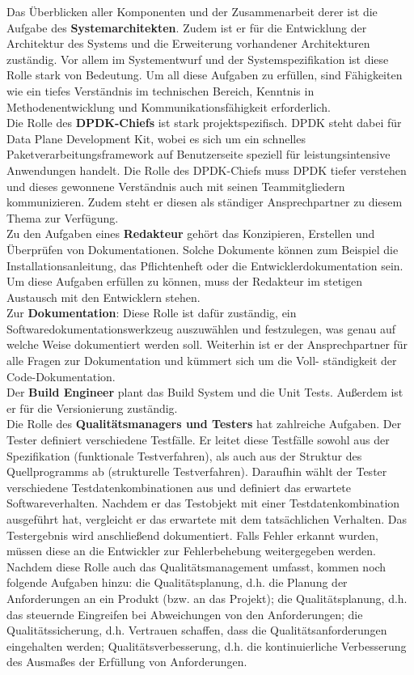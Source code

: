\documentclass[../review_1.tex]{subfiles}
\begin{document}
Das Überblicken aller Komponenten und der Zusammenarbeit derer ist die Aufgabe des \textbf{Systemarchitekten}. Zudem ist er für die Entwicklung der Architektur des Systems und die Erweiterung vorhandener Architekturen zuständig. Vor allem im Systementwurf und der Systemspezifikation ist diese Rolle stark von Bedeutung. Um all diese Aufgaben zu erfüllen, sind Fähigkeiten wie ein tiefes Verständnis im technischen Bereich, Kenntnis in Methodenentwicklung und Kommunikationsfähigkeit erforderlich.\\
Die Rolle des \textbf{DPDK-Chiefs} ist stark projektspezifisch. DPDK steht dabei für Data Plane Development Kit, wobei es sich um ein schnelles Paketverarbeitungsframework auf Benutzerseite speziell für leistungsintensive Anwendungen handelt. Die Rolle des DPDK-Chiefs muss DPDK tiefer verstehen und dieses gewonnene Verständnis auch mit seinen Teammitgliedern kommunizieren. Zudem steht er diesen als ständiger Ansprechpartner zu diesem Thema zur Verfügung.\\
Zu den Aufgaben eines \textbf{Redakteur} gehört das Konzipieren, Erstellen und Überprüfen von Dokumentationen. Solche Dokumente können zum Beispiel die Installationsanleitung, das Pflichtenheft oder die Entwicklerdokumentation sein. Um diese Aufgaben erfüllen zu können, muss der Redakteur im stetigen Austausch mit den Entwicklern stehen.\\
Zur \textbf{Dokumentation}: Diese Rolle ist dafür zuständig, ein Softwaredokumentationswerkzeug auszuwählen und festzulegen, was genau auf welche Weise dokumentiert werden soll. Weiterhin ist er der Ansprechpartner für alle Fragen zur Dokumentation und kümmert sich um die Voll- ständigkeit der Code-Dokumentation.\\	Der \textbf{Build Engineer} plant das Build System und die Unit Tests. Außerdem ist er für die Versionierung zuständig.\\
Die Rolle des \textbf{Qualitätsmanagers und Testers} hat zahlreiche Aufgaben. Der Tester definiert  verschiedene Testfälle. Er leitet diese Testfälle sowohl aus der Spezifikation (funktionale Testverfahren), als auch aus der Struktur des Quellprogramms ab (strukturelle Testverfahren). Daraufhin  wählt der Tester verschiedene Testdatenkombinationen aus und definiert das erwartete Softwareverhalten. Nachdem er das Testobjekt mit einer Testdatenkombination ausgeführt hat, vergleicht er das erwartete mit dem tatsächlichen Verhalten. Das Testergebnis wird anschließend dokumentiert. Falls Fehler erkannt wurden, müssen diese an die Entwickler zur Fehlerbehebung weitergegeben werden. Nachdem diese Rolle auch das Qualitätsmanagement umfasst, kommen noch folgende Aufgaben hinzu: die Qualitätsplanung, d.h. die Planung der Anforderungen an ein Produkt (bzw. an das Projekt); die Qualitätsplanung, d.h. das steuernde Eingreifen bei Abweichungen von den Anforderungen; die Qualitätssicherung, d.h. Vertrauen schaffen, dass die Qualitätsanforderungen eingehalten werden; Qualitätsverbesserung, d.h. die kontinuierliche Verbesserung des Ausmaßes der Erfüllung von Anforderungen.\\
\end{document}
